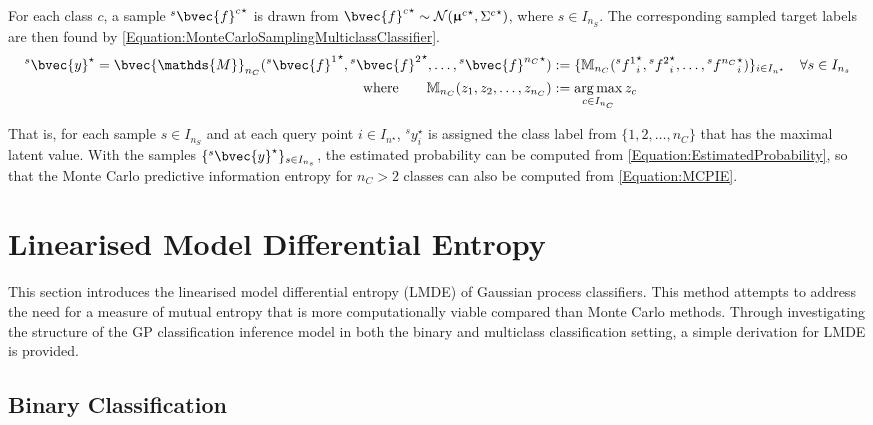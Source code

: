 			For each class $c$, a sample ${^{s}}{\bvec{f}^{c}}^{\star}$ is drawn from ${\bvec{f}^{c}}^{\star} \sim \mathcal{N}({\vec{\upmu}^{c}}^{\star}, {\Sigma^{c}}^{\star})$, where $s \in I_{n_{S}}$. The corresponding sampled target labels are then found by \eqref{Equation:MonteCarloSamplingMulticlassClassifier}. \begin{equation}
				\begin{aligned}
					{^{s}}\bvec{y}^{\star} = \bvec{\mathds{M}}_{n_{C}}({^{s}}{\bvec{f}^{1}}^{\star}, {^{s}}{\bvec{f}^{2}}^{\star}, \dots, {^{s}}{\bvec{f}^{n_{C}}}^{\star}) &:= \{\mathbb{M}_{n_{C}}({^{s}}{f^{1}}^{\star}_{i}, {^{s}}{f^{2}}^{\star}_{i}, \dots, {^{s}}{f^{n_{C}}}^{\star}_{i})\}_{i \in I_{n^{\star}}} \quad \forall s \in I_{n_{s}} \\
					\mathrm{where} \qquad \mathbb{M}_{n_{C}}(z_{1}, z_{2}, \dots, z_{n_{C}}) &:= \argmax_{c \in I_{n_{C}}} z_{c}
				\end{aligned}
			\label{Equation:MonteCarloSamplingMulticlassClassifier}
			\end{equation}
			
			That is, for each sample $s \in I_{n_{S}}$ and at each query point $i \in I_{n^{\star}}$, ${^{s}}y^{\star}_{i}$ is assigned the class label from $\{1, 2, \dots, n_{C}\}$ that has the maximal latent value. With the samples $\{{^{s}}\bvec{y}^{\star}\}_{s \in I_{n_{s}}}$, the estimated probability can be computed from \eqref{Equation:EstimatedProbability}, so that the Monte Carlo predictive information entropy for $n_{C} > 2$ classes can also be computed from \eqref{Equation:MCPIE}.
			
	\section{Linearised Model Differential Entropy}
	\label{InformativeSeafloorExploration:LMDE}
	
		This section introduces the linearised model differential entropy (LMDE) of Gaussian process classifiers. This method attempts to address the need for a measure of mutual entropy that is more computationally viable compared than Monte Carlo methods. Through investigating the structure of the GP classification inference model in both the binary and multiclass classification setting, a simple derivation for LMDE is provided.
		
		\subsection{Binary Classification}
		\label{InformativeSeafloorExploration:LMDE:Binary}
		
